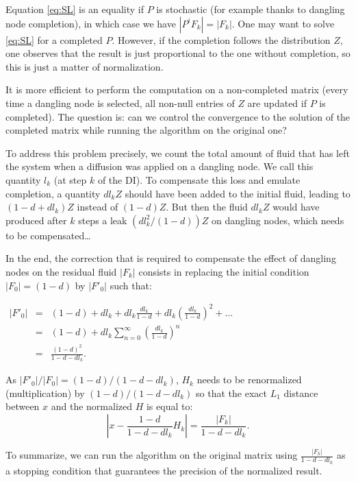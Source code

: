 \documentclass{llncs}
\begin{document}
Equation \eqref{eq:SL} is an equality if $P$ is stochastic (for example thanks to dangling node completion), in which case we have  $|P^i F_k| = |F_k|$. 
One may want to solve \eqref{eq:SL} for a completed $ P $. However, if the completion follows the distribution $ Z $, one observes that the result is just proportional to the one without completion, so this is just a matter of normalization.

It is more efficient  to perform the computation on a non-completed matrix (every time a dangling node is selected, all non-null entries of $ Z $ are updated if $ P $ is completed). The question is: can we control the convergence to the solution of the completed matrix while running the algorithm on the original one?


To address this problem precisely, we count the total amount of fluid that has left the system when a diffusion was applied on a dangling node. We call this quantity $l_k$ (at step $k$ of the DI). To compensate this loss and emulate completion, a quantity $d l_k Z$ should have been added to the initial fluid, leading to $(1-d+dl_k)Z$ instead of $(1-d)Z$. But then the fluid $dl_k Z$ would have produced after $k$ steps a leak $(d l_k^2/(1-d))Z$ on dangling nodes, which needs to be compensated\ldots 

In the end, the correction that is required to compensate the effect of dangling nodes on the residual fluid $|F_k|$ consists in replacing the initial condition $|F_0|=(1-d)$ by  $|F'_0|$ such that:
\begin{center}
$\begin{array}{lcl}|F'_0| &=& (1-d) + d l_k + d l_k\displaystyle\frac{d l_k}{1-d} + d l_k\left(\displaystyle\frac{d l_k}{1-d}\right)^2 + ...\\
&=& (1-d) + d l_k\displaystyle\sum_{n=0}^{\infty}\left(\frac{d l_k}{1-d}\right)^n \\
&=& \displaystyle\frac{(1-d)^2}{1-d - d l_k}. \end{array}$
\end{center}

As $|F'_0|/|F_0|=(1-d)/(1-d-d l_k)$, $H_k$ needs to be renormalized (multiplication) by $(1-d)/(1-d-d l_k)$ so that the exact $L_1$ distance between $ x $ and the normalized $H$ is equal to:
$$
|x-\displaystyle\frac{1-d}{1-d-d l_k}H_k| = \displaystyle\frac{|F_k|}{1-d-d l_k}.
$$

To summarize, we can run the algorithm on the original matrix using 
$ \frac{|F_k|}{1-d-d l_k} $ as a stopping condition that guarantees the precision of the normalized result.
\end{document}
